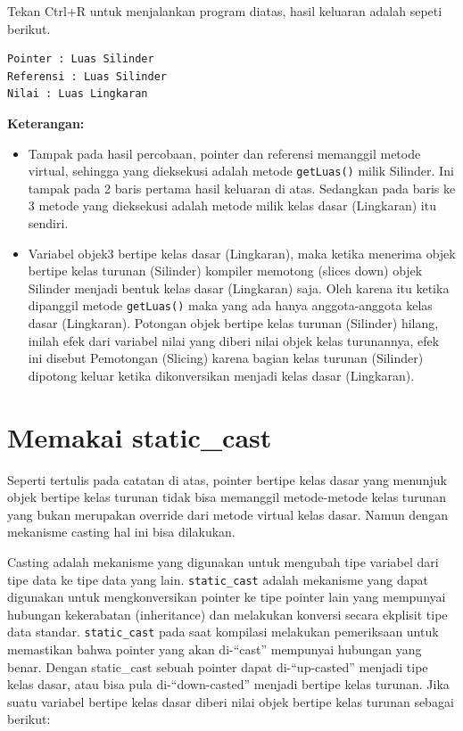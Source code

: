Tekan Ctrl+R untuk menjalankan program diatas, hasil keluaran adalah
sepeti berikut.

\begin{verbatim}
Pointer : Luas Silinder
Referensi : Luas Silinder
Nilai : Luas Lingkaran
\end{verbatim}

\textbf{Keterangan:}

\begin{itemize}
\tightlist
\item
  Tampak pada hasil percobaan, pointer dan referensi memanggil metode
  virtual, sehingga yang dieksekusi adalah metode \texttt{getLuas()}
  milik Silinder. Ini tampak pada 2 baris pertama hasil keluaran di
  atas. Sedangkan pada baris ke 3 metode yang dieksekusi adalah metode
  milik kelas dasar (Lingkaran) itu sendiri.
\item
  Variabel objek3 bertipe kelas dasar (Lingkaran), maka ketika menerima
  objek bertipe kelas turunan (Silinder) kompiler memotong (slices down)
  objek Silinder menjadi bentuk kelas dasar (Lingkaran) saja. Oleh
  karena itu ketika dipanggil metode \texttt{getLuas()} maka yang ada
  hanya anggota-anggota kelas dasar (Lingkaran). Potongan objek bertipe
  kelas turunan (Silinder) hilang, inilah efek dari variabel nilai yang
  diberi nilai objek kelas turunannya, efek ini disebut Pemotongan
  (Slicing) karena bagian kelas turunan (Silinder) dipotong keluar
  ketika dikonversikan menjadi kelas dasar (Lingkaran).
\end{itemize}

\section{Memakai static\_cast}\label{memakai-staticux5fcast}

Seperti tertulis pada catatan di atas, pointer bertipe kelas dasar yang
menunjuk objek bertipe kelas turunan tidak bisa memanggil metode-metode
kelas turunan yang bukan merupakan override dari metode virtual kelas
dasar. Namun dengan mekanisme casting hal ini bisa dilakukan.

Casting adalah mekanisme yang digunakan untuk mengubah tipe variabel
dari tipe data ke tipe data yang lain. \texttt{static\_cast} adalah
mekanisme yang dapat digunakan untuk mengkonversikan pointer ke tipe
pointer lain yang mempunyai hubungan kekerabatan (inheritance) dan
melakukan konversi secara ekplisit tipe data standar.
\texttt{static\_cast} pada saat kompilasi melakukan pemeriksaan untuk
memastikan bahwa pointer yang akan di-``cast'' mempunyai hubungan yang
benar. Dengan static\_cast sebuah pointer dapat di-``up-casted'' menjadi
tipe kelas dasar, atau bisa pula di-``down-casted'' menjadi bertipe
kelas turunan. Jika suatu variabel bertipe kelas dasar diberi nilai
objek bertipe kelas turunan sebagai berikut:

